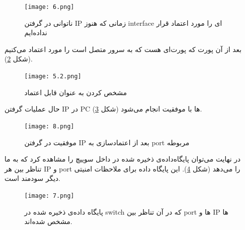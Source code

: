 \documentclass{article}
\begin{document}
\begin{figure}[h!]
	\centering
	\texttt{[image: 6.png]}
	\caption{ناتوانی در گرفتن IP زمانی که هنوز interface‌ ای را مورد اعتماد قرار نداده‌ایم}
	\label{fig:scenario-8}
\end{figure}

بعد از آن پورت  که پورت‌ای هست که به سرور متصل است را مورد اعتماد می‌کنیم (شکل \ref{fig:scenario-7}).

\begin{figure}[h!]
	\centering
	\texttt{[image: 5.2.png]}
	\caption{مشخص کردن  به عنوان قابل اعتماد}
	\label{fig:scenario-7}
\end{figure}

حال عملیات گرفتن IP در PC ها با موفقیت انجام می‌شود (شکل \ref{fig:scenario-10}).

\begin{figure}[h!]
	\centering
	\texttt{[image: 8.png]}
	\caption{موفقیت در گرفتن IP بعد از اعتماد‌سازی به port مربوطه}
	\label{fig:scenario-10}
\end{figure}

در نهایت می‌توان پایگاه‌داده‌ی ذخیره‌ شده در داخل سوییچ را مشاهده کرد که به ما تناظر بین هر IP و port را می‌دهد (شکل \ref{fig:scenario-9}). این پایگاه داده برای ملاحظات امنیتی دیگر سودمند است.

\begin{figure}[h!]
	\centering
	\texttt{[image: 7.png]}
	\caption{پایگاه داده‌ی ذخیره‌ شده در switch که در آن تناظر بین port ها و IP ها مشخص شده‌اند.}
	\label{fig:scenario-9}
\end{figure}
\end{document}
